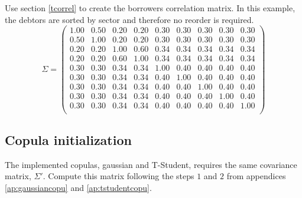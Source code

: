 \documentclass[a4paper,12pt,final]{article}
\begin{document}
Use section \ref{tcorrel} to create the borrowers correlation matrix. In 
this example, the debtors are sorted by sector and therefore no reorder is 
required.
\begin{displaymath}
\Sigma = 
\left( 
\begin{array}{cc|cc|ccccc}
 1.00 & 0.50 & 0.20 & 0.20 & 0.30 & 0.30 & 0.30 & 0.30 & 0.30 \\
 0.50 & 1.00 & 0.20 & 0.20 & 0.30 & 0.30 & 0.30 & 0.30 & 0.30 \\
\hline
 0.20 & 0.20 & 1.00 & 0.60 & 0.34 & 0.34 & 0.34 & 0.34 & 0.34 \\
 0.20 & 0.20 & 0.60 & 1.00 & 0.34 & 0.34 & 0.34 & 0.34 & 0.34 \\
\hline
 0.30 & 0.30 & 0.34 & 0.34 & 1.00 & 0.40 & 0.40 & 0.40 & 0.40 \\
 0.30 & 0.30 & 0.34 & 0.34 & 0.40 & 1.00 & 0.40 & 0.40 & 0.40 \\
 0.30 & 0.30 & 0.34 & 0.34 & 0.40 & 0.40 & 1.00 & 0.40 & 0.40 \\
 0.30 & 0.30 & 0.34 & 0.34 & 0.40 & 0.40 & 0.40 & 1.00 & 0.40 \\
 0.30 & 0.30 & 0.34 & 0.34 & 0.40 & 0.40 & 0.40 & 0.40 & 1.00 \\
\end{array}
\right)
\end{displaymath}

\subsection{Copula initialization}

The implemented copulas, gaussian and T-Student, requires the same covariance 
matrix, $\Sigma'$. Compute this matrix following the steps $1$ and $2$ from 
appendices \ref{ap:gaussiancopu} and \ref{ap:tstudentcopu}.
\newline
\end{document}
